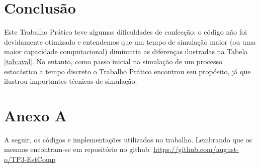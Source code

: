 \documentclass[a4paper,12pt,english,brazil]{article}
\begin{document}
\section{Conclusão}
Este Trabalho Prático teve algumas dificuldades de confecção: o código não foi devidamente otimizado e entendemos que um tempo de simulação maior (ou uma maior capacidade computacional) diminuiria as diferenças ilustradas na Tabela \ref{tab:aval}. No entanto, como passo inicial na simulação de um processo estocástico a tempo discreto o Trabalho Prático encontrou seu propósito, já que ilustrou importantes técnicas de simulação.
\newpage

\section*{Anexo A}
A seguir, os códigos e implementações utilizados no trabalho. Lembrando que os mesmos encontram-se em repositório no github: \url{https://github.com/august-o/TP3-EstComp}
\end{document}
